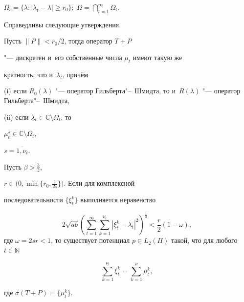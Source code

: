  $\Omega_t=\{\lambda:|\lambda_t-\lambda|\ge r_0\};$ $\Omega=\bigcap\limits_{t=1}^\infty\Omega_t $. 





Справедливы следующие утверждения\cite{Sedov}.



\begin{lemma} Пусть $\|P\|<r_0/2$,  тогда оператор $T+P$

"--- дискретен и~его собственные числа $\mu_{t}$ имеют такую же

кратность,  что и~$\lambda_{t}$,  причём



{\rm (i)} если $R_{0}(\lambda)$ "--- оператор Гильберта"--~Шмидта,  то и~$R(\lambda)$ "--- оператор Гильберта"--~Шмидта, 



{\rm (ii)} если $\lambda_{t}\in \mathbb{C}\setminus \Omega_{t}$,  то

$\mu_{t}^s\in \mathbb{C}\setminus \Omega_{t} $, 

$s=\overline{1, \nu_t} $. 

\end{lemma}





\begin{theorem}\label{th221.1}Пусть $\beta>\frac{3}2 $, 

$r\in\bigl(0,  \min\bigl\{r_0, \frac1{2s}\bigr\}\bigr) $.  Если для комплексной

последовательности $\{\xi_t^k\}$ выполняется неравенство 

$$ 

2\sqrt{ab}\left(\sum_{t=1}^{\infty}\sum_{k=1}^{\nu_t}|\xi_t^k-\lambda_t|^2\right)^{\frac12}<\frac

r2(1-\omega) ,$$ где $\omega=2 sr<1 $,  то существует потенциал $p\in

L_2(\Pi)$ такой,  что для любого $t\in\mathbb{N}$


\begin{equation}\label{e221.4}

\sum_{k=1}^{\nu_t}\xi_t^k=\sum_{k=1}^{\nu}\mu_t^k, 

\end{equation}

где $\sigma(T+P)=\{\mu_t^k\} $. 

\end{theorem}





